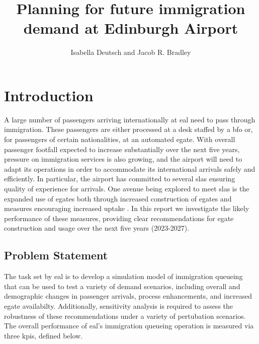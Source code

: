 \documentclass[10pt]{article}
\title{Planning for future immigration demand at Edinburgh Airport}
\author{Isabella Deutsch and Jacob R. Bradley}
\date{}
\begin{document}
\maketitle

\section{Introduction}

A large number of passengers arriving internationally at \gls{eal} need to pass through immigration. These passengers are either processed at a desk staffed by a \gls{bfo} or, for passengers of certain nationalities, at an automated \gls{egate}. With overall passenger footfall expected to increase substantially over the next five years, pressure on immigration services is also growing, and the airport will need to adapt its operations in order to accommodate its international arrivals safely and efficiently. In particular, the airport has committed to several \glspl{sla} ensuring quality of experience for arrivals. One avenue being explored to meet \glspl{sla} is the expanded use of \glspl{egate} both through increased construction of \glspl{egate} and measures encouraging increased uptake \cite{UK_border_2025}. In this report we investigate the likely performance of these measures, providing clear recommendations for \gls{egate} construction and usage over the next five years (2023-2027).

\subsection{Problem Statement}
The task set by \gls{eal} is to develop a simulation model of immigration queueing that can be used to test a variety of demand scenarios, including overall and demographic changes in passenger arrivals, process enhancements, and increased \gls{egate} availabilty. 
Additionally, sensitivity analysis is required to assess the robustness of these recommendations under a variety of pertubation scenarios.
The overall performance of \gls{eal}'s immigration queueing operation is measured via three \glspl{kpi}, defined below.
\end{document}
